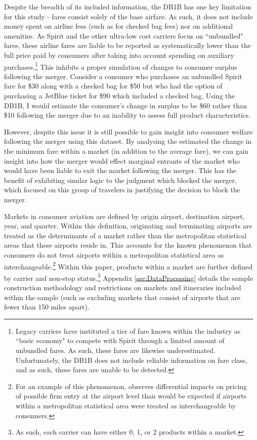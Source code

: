 \documentclass{article}
\begin{document}
    Despite the breadth of its included information, the DB1B has one key limitation for this study - fares consist solely of the base airfare. As such, it does not include money spent on airline fees (such as for checked bag fees) nor on additional amenities. As Spirit and the other ultra-low cost carriers focus on ``unbundled" fares, these airline fares are liable to be reported as systematically lower than the full price paid by consumers after taking into account spending on auxiliary purchases.\footnote{Legacy carriers have instituted a tier of fare known within the industry as ``basic economy" to compete with Spirit through a limited amount of unbundled fares. As such, these fares are likewise underestimated. Unfortunately, the DB1B does not include reliable information on fare class, and as such, these fares are unable to be detected.} This inhibits a proper simulation of changes to consumer surplus following the merger. Consider a consumer who purchases an unbundled Spirit fare for \$30 along with a checked bag for \$50 but who had the option of purchasing a JetBlue ticket for \$90 which included a checked bag. Using the DB1B, I would estimate the consumer's change in surplus to be \$60 rather than \$10 following the merger due to an inability to assess full product characteristics. 
    
    However, despite this issue it is still possible to gain insight into consumer welfare following the merger using this dataset. By analysing the estimated the change in the minimum fare within a market (in addition to the average fare), we can gain insight into how the merger would effect marginal entrants of the market who would have been liable to exit the market following the merger. This has the benefit of exhibiting similar logic to the judgment which blocked the merger, which focused on this group of travelers in justifying the decision to block the merger. 
    	
	Markets in consumer aviation are defined by origin airport, destination airport, year, and quarter. Within this definition, originating and terminating airports are treated as the determinants of a market rather than the metropolitan statistical areas that these airports reside in. This accounts for the known phenomenon that consumers do not treat airports within a metropolitan statistical area as interchangeable.\footnote{For an example of this phenomenon, \citet{goolsbee_how_2008} observes differential impacts on pricing of possible firm entry at the airport level than would be expected if airports within a metropolitan statistical area were treated as interchangeable by consumers.} Within this paper, products within a market are further defined by carrier and non-stop status.\footnote{As such, each carrier can have either 0, 1, or 2 products within a market.} Appendix \ref{sec:DataProcessing} details the sample construction methodology and restrictions on markets and itineraries included within the sample (such as excluding markets that consist of airports that are fewer than 150 miles apart).
	
\end{document}
